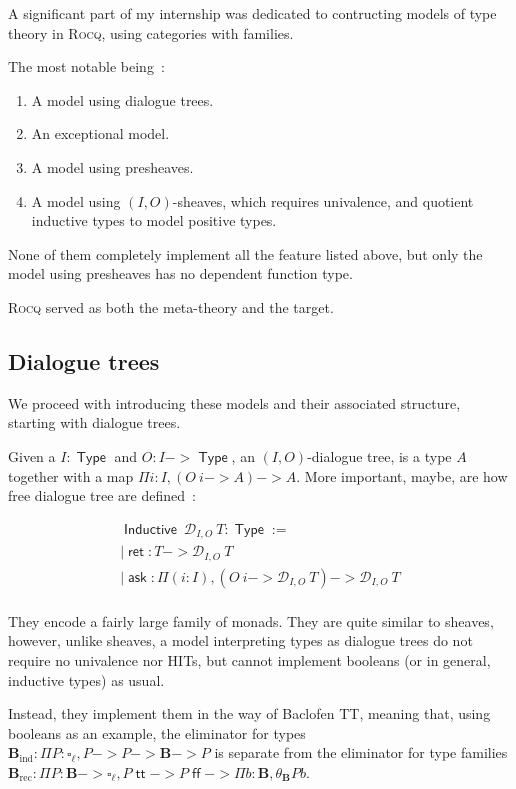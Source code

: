 \documentclass[11pt]{article}
\DeclareMathOperator{\Type}{\mathsf{Type}}
\DeclareMathOperator{\ask}{\mathsf{ask}}
\DeclareMathOperator{\Inductive}{\mathsf{Inductive}}
\DeclareMathOperator{\ret}{\mathsf{ret}}
\DeclareMathOperator{\rec}{rec}
\DeclareMathOperator{\ind}{ind}
\DeclareMathOperator{\true}{\mathsf{tt}}
\DeclareMathOperator{\false}{\mathsf{ff}}
\newcommand{\0}{\mathbf{0}}
\newcommand{\1}{\mathbf{1}}
\newcommand{\bool}{\mathbf{B}}
\begin{document}
A significant part of my internship was dedicated to contructing models of type theory in \textsc{Rocq}, using categories with families.

The most notable being~:
\begin{enumerate}
    \item A model using dialogue trees.
    \item An exceptional model.
    \item A model using presheaves.
    \item A model using $(I,O)$-sheaves, which requires univalence, and quotient inductive types to model positive types.
\end{enumerate}

None of them completely implement all the feature listed above, but only the model using presheaves has no dependent function type.

\textsc{Rocq} served as both the meta-theory and the target.

\subsection{Dialogue trees}

We proceed with introducing these models and their associated structure, starting with dialogue trees.

Given a $I : \Type$ and $O : I -> \Type$, an $(I,O)$-dialogue tree, is a type $A$ together with a map $\Pi i : I, (O\ i-> A) -> A$. More important, maybe, are how free dialogue tree are defined~: 

$$
\begin{array}{l}
    \Inductive\ \mathcal{D}_{I,O}\ T : \Type := \\
    \mid \ret : T -> \mathcal{D}_{I,O}\ T\\
    \mid \ask : \Pi (i : I),(O\ i -> \mathcal{D}_{I,O}\ T) -> \mathcal{D}_{I,O}\ T\\
\end{array}
$$

They encode a fairly large family of monads. They are quite similar to sheaves, however, unlike sheaves, a model interpreting types as dialogue trees do not require no univalence nor HITs, but cannot implement booleans (or in general, inductive types) as usual.

Instead, they implement them in the way of Baclofen TT, meaning that, using booleans as an example, the eliminator for types $\bool_{\ind} : \Pi P : \square_\ell, P -> P -> \bool -> P $ is separate from the eliminator for type families $\bool_{\rec} : \Pi P : \bool -> \square_\ell, P \true -> P \false -> \Pi b : \bool, \theta_\bool P b$.
\end{document}

